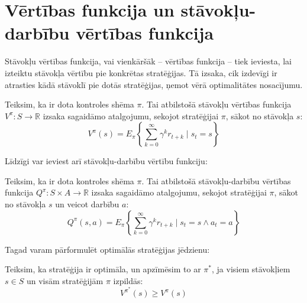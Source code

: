 \documentclass{ludis} %
\begin{document}

\section{Vērtības funkcija un stāvokļu-darbību vērtības funkcija}
Stāvokļu vērtības funkcija, vai vienkāršāk -- vērtības funkcija -- tiek ieviesta, lai izteiktu stāvokļa vērtību pie konkrētas stratēģijas.
Tā izsaka, cik izdevīgi ir atrasties kādā stāvoklī pie dotās stratēģijas, ņemot vērā optimalitātes nosacījumu.
\begin{definicija}
Teiksim, ka ir dota kontroles shēma $\pi$.
Tai atbilstošā stāvokļu vērtības funkcija $V^\pi : S \rightarrow \mathbb{R}$ izsaka sagaidāmo atalgojumu, sekojot stratēģijai $\pi$, sākot no stāvokļa $s$:
\begin{equation} \label{eq:vpi}
	V^\pi (s) = E_\pi \left\{ \sum_{k=0}^{\infty} \gamma^k r_{t+k} \mid s_t = s\right\}
\end{equation}
\end{definicija}

Līdzīgi var ieviest arī stāvokļu-darbību vērtību funkciju:
\begin{definicija}
Teiksim, ka ir dota kontroles shēma $\pi$.
Tai atbilstošā stāvokļu-darbību vērtības funkcija $Q^\pi : S \times A \rightarrow \mathbb{R}$ izsaka sagaidāmo atalgojumu, sekojot stratēģijai $\pi$, sākot no stāvokļa $s$ un veicot darbību $a$:
\[
	Q^\pi (s,a) = E_\pi \left\{ \sum_{k=0}^{\infty} \gamma^k r_{t+k} \mid s_t = s \land a_t = a\right\}
\]
\end{definicija}

Tagad varam pārformulēt optimālās stratēģijas jēdzienu:
\begin{definicija}
Teiksim, ka stratēģija ir optimāla, un apzīmēsim to ar $\pi^*$, ja visiem stāvokļiem $s \in S$ un visām stratēģijām $\pi$ izpildās:
\[
	V^{\pi^*}(s) \geq V^{\pi}(s)
\]
\end{definicija}
\end{document}
